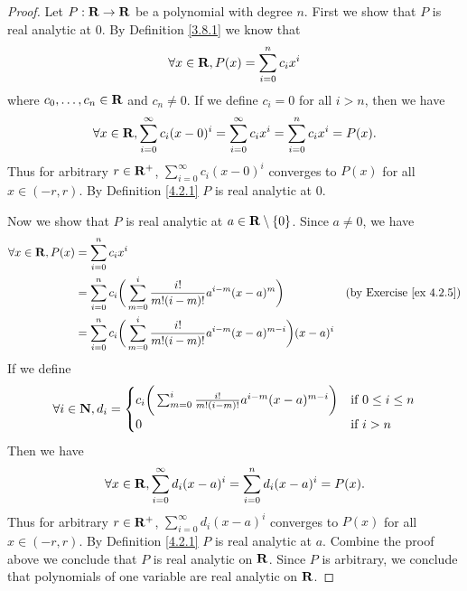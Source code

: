 \begin{proof}
    Let \(P : \mathbf{R} \to \mathbf{R}\) be a polynomial with degree \(n\).
    First we show that \(P\) is real analytic at \(0\).
    By Definition \ref{3.8.1} we know that
    \[
        \forall x \in \mathbf{R}, P(x) = \sum_{i = 0}^n c_i x^i
    \]
    where \(c_0, \dots, c_n \in \mathbf{R}\) and \(c_n \neq 0\).
    If we define \(c_i = 0\) for all \(i > n\), then we have
    \[
        \forall x \in \mathbf{R}, \sum_{i = 0}^\infty c_i (x - 0)^i = \sum_{i = 0}^\infty c_i x^i = \sum_{i = 0}^n c_i x^i = P(x).
    \]
    Thus for arbitrary \(r \in \mathbf{R}^+\), \(\sum_{i = 0}^\infty c_i (x - 0)^i\) converges to \(P(x)\) for all \(x \in (-r, r)\).
    By Definition \ref{4.2.1} \(P\) is real analytic at \(0\).

    Now we show that \(P\) is real analytic at \(a \in \mathbf{R} \setminus \{0\}\).
    Since \(a \neq 0\), we have
    \begin{align*}
        \forall x \in \mathbf{R}, P(x) & = \sum_{i = 0}^n c_i x^i                                                                                                                         \\
                               & = \sum_{i = 0}^n c_i \bigg(\sum_{m = 0}^i \frac{i!}{m! (i - m)!} a^{i - m} (x - a)^m\bigg)                 & \text{(by Exercise \ref{ex 4.2.5})} \\
                               & = \sum_{i = 0}^n c_i \bigg(\sum_{m = 0}^i \frac{i!}{m! (i - m)!} a^{i - m} (x - a)^{m - i}\bigg) (x - a)^i
    \end{align*}
    If we define
    \[
        \forall i \in \mathbf{N}, d_i = \begin{cases}
            c_i \bigg(\sum_{m = 0}^i \frac{i!}{m! (i - m)!} a^{i - m} (x - a)^{m - i}\bigg) & \text{if } 0 \leq i \leq n \\
            0                                                                               & \text{if } i > n
        \end{cases}
    \]
    Then we have
    \[
        \forall x \in \mathbf{R}, \sum_{i = 0}^\infty d_i (x - a)^i = \sum_{i = 0}^n d_i (x - a)^i = P(x).
    \]
    Thus for arbitrary \(r \in \mathbf{R}^+\), \(\sum_{i = 0}^\infty d_i (x - a)^i\) converges to \(P(x)\) for all \(x \in (-r, r)\).
    By Definition \ref{4.2.1} \(P\) is real analytic at \(a\).
    Combine the proof above we conclude that \(P\) is real analytic on \(\mathbf{R}\).
    Since \(P\) is arbitrary, we conclude that polynomials of one variable are real analytic on \(\mathbf{R}\).
\end{proof}

